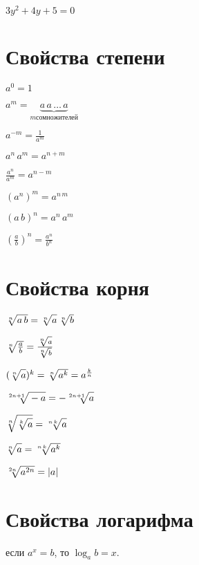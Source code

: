 $ 3y^2 + 4y + 5 = 0 $


\section{Свойства степени}

$ a^0 = 1 $

$ a^m = \underbrace{a\, a \, \ldots \, a }_{m сомножителей} $

$ a^{-m} = \frac{1}{a^m} $

$ a^n\, a^m = a^{n+m} $

$ \frac{a^n}{a^m} = a^{n-m} $

$ (a^n)^m = a^{n\, m} $

$ (a\, b)^n = a^n\, a^m $

$ \left(\frac{a}{b} \right)^n = \frac{a^n}{b^n} $


\section{Свойства корня}

$ \sqrt[n]{\mathstrut a\, b} = \sqrt[n]{\mathstrut a} \, \sqrt[n]{\mathstrut b} $

$ \sqrt[n]{\mathstrut \frac{a}{b}} = \frac{\sqrt[n]{\mathstrut a}}{\sqrt[n]{\mathstrut b}} $

$ (\sqrt[n]{\mathstrut a})^k = \sqrt[n]{\mathstrut a^k} = a^{\frac{k}{n}} $

$ \sqrt[2n + 1]{\mathstrut -a} = -\sqrt[2n + 1]{\mathstrut a} $

$ \sqrt[n]{\mathstrut \sqrt[k]{\mathstrut a}} = \sqrt[n\, k]{\mathstrut a} $

$ \sqrt[n]{\mathstrut a} = \sqrt[n\, k]{\mathstrut a^k} $

$ \sqrt[2n]{\mathstrut a^{2n}} = |a| $


\section{Свойства логарифма}

\begin{center}
	если $ a^x = b $, то $ \log_a b = x $.
\end{center}

